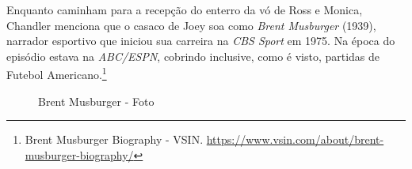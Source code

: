 \saveparinfos
\noindent
\begin{minipage}[c]{0.5\textwidth}\useparinfo

Enquanto caminham para a recepção do enterro da vó de Ross e Monica,
Chandler menciona que o casaco de Joey soa como \emph{Brent Musburger}
(1939), narrador esportivo que iniciou sua carreira na \emph{CBS Sport}
em 1975. Na época do episódio estava na \emph{ABC/ESPN}, cobrindo
inclusive, como é visto, partidas de Futebol Americano.\footnote{\sloppy Brent Musburger Biography - VSIN. \url{https://www.vsin.com/about/brent-musburger-biography/}}

\end{minipage}\hfill
\begin{minipage}[c]{0.5\textwidth}

\begin{figure}
  \centering
    \caption{Brent Musburger - Foto\label{fig:brent-musburger-foto}}
\end{figure}

\end{minipage}
